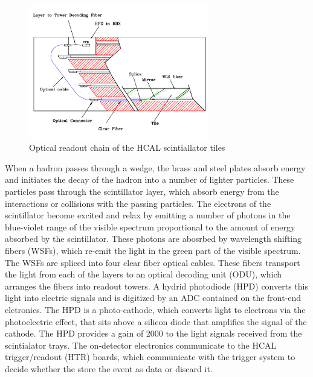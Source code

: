 \begin{figure}[h]
   \centering
  \includegraphics[width=0.7\textwidth]{Figures/CMS_Diagrams/HCAL__OpticalReadout.pdf}
  \caption{Optical readout chain of the HCAL scintiallator tiles} \label{fig:hcal_navy_shells}
\end{figure}

\par When a hadron passes through a wedge, the brass and steel plates
absorb energy and initiates the decay of the hadron into a number of
lighter particles.  These particles pass through the scintillator
layer, which absorb energy from the interactions or collisions with
the passing particles.  The electrons of the scintillator become
excited and relax by emitting a number of photons in the blue-violet
range of the visible spectrum proportional to the amount of energy
absorbed by the scintillator.   These photons are abosrbed by
wavelength shifting fibers (WSFs), which re-emit the light in the
green part of the visible spectrum.  The WSFs are spliced into 
four clear fiber optical cables.  These fibers transport the light
from each of the layers to an optical decoding unit (ODU), which
arranges the fibers into readout towers.  A hydrid photodiode (HPD)
converts this light into electric signals and is digitized by an ADC
contained on the front-end elctronics.  The HPD is a photo-cathode,
which converts light to electrons via the photoelectric effect, that
sits above a silicon diode that amplifies the signal of the cathode.
The HPD provides a gain of 2000 to the light signals received from the
scintialator trays.  The on-detector electronics communicate to the
HCAL trigger/readout (HTR) boards, which communicate with the trigger
system to decide whether the store the event as data or discard it.  

